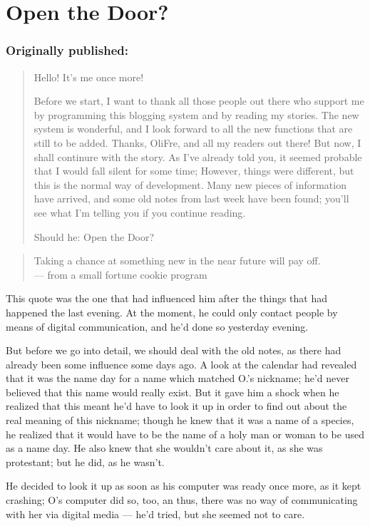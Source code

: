 \chapter{Open the Door?}
\label{cha:open-the-door}
\subsection*{Originally published: }
\begin{quote}
Hello! It's me once more!

Before we start, I want to thank all those people out there who support me by programming this blogging system and by reading my stories. The new system is wonderful, and I look forward to all the new functions that are still to be added. Thanks, OliFre, and all my readers out there!
But now, I shall continure with the story. As I've already told you, it seemed probable that I would fall silent for some time; However, things were different, but this is the normal way of development. Many new pieces of information have arrived, and some old notes from last week have been found; you'll see what I'm telling you if you continue reading.

Should he: Open the Door?
\end{quote}

\begin{quote}
Taking a chance at something new in the near future will pay off.\\
--- from a small fortune cookie program
\end{quote}
This quote was the one that had influenced him after the things that had happened the last evening. At the moment, he could only contact people by means of digital communication, and he'd done so yesterday evening.

But before we go into detail, we should deal with the old notes, as there had already been some influence some days ago.
A look at the calendar had revealed that it was the name day for a name which matched O.'s nickname; he'd never believed that this name would really exist. But it gave him a shock when he realized that this meant he'd have to look it up in order to find out about the real meaning of this nickname; though he knew that it was a name of a species, he realized that it would have to be the name of a holy man or woman to be used as a name day.
He also knew that she wouldn't care about it, as she was protestant; but he did, as he wasn't.

He decided to look it up as soon as his computer was ready once more, as it kept crashing; O's computer did so, too, an thus, there was no way of communicating with her via digital media --- he'd tried, but she seemed not to care.


